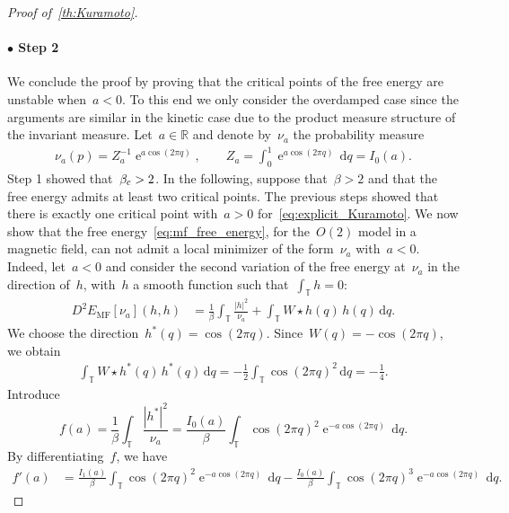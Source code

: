\documentclass[onefignum,onetabnum]{siamart251216} %
\DeclareMathOperator{\e}{e}
\renewcommand{\d}{\mathrm{d}}
\newcommand{\torus}{\mathbb T}
\newcommand{\real}{\mathbb R}
\newcommand{\mespos}{\nu}
\newcommand{\emf}{E_{\mathrm{MF}}}
\theoremstyle{plain}
\numberwithin{equation}{section}
\numberwithin{theorem}{section}
\begin{document}
\begin{proof}[Proof of~{\cref{th:Kuramoto}}]
\paragraph{$\bullet$ Step 2}
    We conclude the proof by proving that the critical points of the free energy are unstable when~$a < 0$. To this end we only consider the overdamped case since the arguments are similar in the kinetic case due to the product measure structure of the invariant measure. Let~$a \in \real$ and denote by~$\mespos_a$ the probability measure
    \begin{align}
        \label{eq:explicit_Kuramoto}
    \mespos_a(p) = Z_a^{-1} \e^{a\cos(2\pi q)},\qquad
    Z_a = \int_0^1 \e^{a\cos(2\pi q)} \, \d q = I_0(a).
    \end{align}
    Step 1 showed that~$\beta_{\rm c} > 2$. In the following, suppose that~$\beta > 2$ and that the free energy admits at least two critical points. The previous steps showed that there is exactly one critical point with~$a > 0$ for~\eqref{eq:explicit_Kuramoto}. We now show that the free energy~\eqref{eq:mf_free_energy}, for the~$O(2)$ model in a magnetic field, can not admit a local minimizer of the form~$\mespos_a$ with~$a < 0$. Indeed, let~$a < 0$ and consider the second variation of the free energy at~$\mespos_a$ in the direction of~$h$, with~$h$ a smooth function such that~$\int_{\torus} h = 0$:
    \begin{align}
        \label{eq:second_var_free_energy}
        D^2 \emf[\mespos_a](h,h)
        &= \frac1\beta\int_{\torus} \frac{|h|^2}{\mespos_a}
        + \int_{\torus}W\star h(q)\,h(q)\,\d q.
    \end{align}
    We choose the direction~$h^*(q) = \cos(2\pi q)$. Since~$W(q) = -\cos(2\pi q)$, we obtain
    \begin{align}
        \label{eq:convol_term_second_var_free_energy}
        \int_{\torus}W\star h^*(q)\,h^*(q)\,\d q = -\frac12\int_{\torus} \cos(2\pi q)^2 \,\d q = -\frac14.
    \end{align}
    Introduce
    \[
    f(a) = \frac1\beta\int_{\torus} \frac{|h^*|^2}{\mespos_a}
    = \frac{I_0(a)}{\beta}\int_{\torus} \cos(2\pi q)^2 \e^{-a\cos(2\pi q)} \, \d q.
    \]
    By differentiating~$f$, we have
    \begin{align}
        \label{eq:derivee_direction_a_free}
        f'(a) &= \frac{I_1(a)}{\beta}\int_{\torus} \cos(2\pi q)^2 \e^{-a\cos(2\pi q)} \, \d q  - \frac{I_0(a)}{\beta}\int_{\torus} \cos(2\pi q)^3 \e^{-a\cos(2\pi q)} \, \d q.
    \end{align}

\end{proof}
\end{document}
